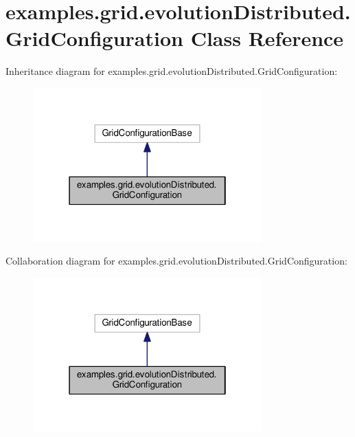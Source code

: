\hypertarget{classexamples_1_1grid_1_1evolution_distributed_1_1_grid_configuration}{\section{examples.\-grid.\-evolution\-Distributed.\-Grid\-Configuration Class Reference}
\label{classexamples_1_1grid_1_1evolution_distributed_1_1_grid_configuration}
}


Inheritance diagram for examples.\-grid.\-evolution\-Distributed.\-Grid\-Configuration\-:
\nopagebreak
\begin{figure}[H]
\begin{center}
\leavevmode
\includegraphics[width=250pt]{classexamples_1_1grid_1_1evolution_distributed_1_1_grid_configuration__inherit__graph}
\end{center}
\end{figure}


Collaboration diagram for examples.\-grid.\-evolution\-Distributed.\-Grid\-Configuration\-:
\nopagebreak
\begin{figure}[H]
\begin{center}
\leavevmode
\includegraphics[width=250pt]{classexamples_1_1grid_1_1evolution_distributed_1_1_grid_configuration__coll__graph}
\end{center}
\end{figure}
